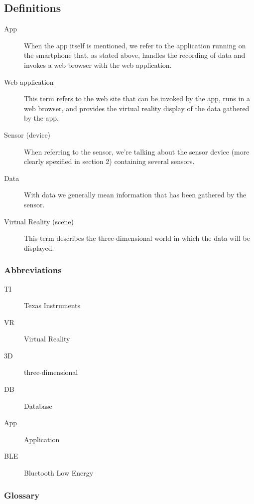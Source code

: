 \subsection{Definitions}

\begin{description}
	\item[App] When the app itself is mentioned, we refer to the application running on the smartphone that, as stated above, handles the recording of data and invokes a web browser with the web application.
	\item[Web application] This term refers to the web site that can be invoked by the app, runs in a web browser, and provides the virtual reality display of the data gathered by the app.
	\item[Sensor (device)] When referring to the sensor, we're talking about the sensor device (more clearly spezified in section 2) containing several sensors. 
	\item[Data] With data we generally mean information that has been gathered by the sensor.
	\item[Virtual Reality (scene)] This term describes the three-dimensional world in which the data will be displayed. 
\end{description}


\subsubsection{Abbreviations}

\begin{description}
	\item[TI] Texas Instruments
	\item[VR] Virtual Reality
	\item[3D] three-dimensional
	\item[DB] Database
	\item[App] Application
	\item[BLE] Bluetooth Low Energy
\end{description}

\subsubsection{Glossary}

